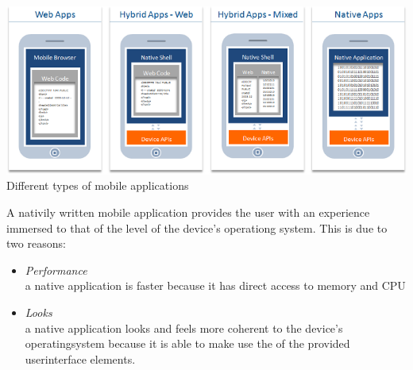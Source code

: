 \begin{centering}
\includegraphics[scale=0.5]{images/apptypesdefined.png}\\{Different types of mobile applications\cite{IBM-Worklight2012}}\\
\end{centering}

A nativily written mobile application provides the user with an experience immersed to that of the level of the device's operationg system. This is due to two reasons:
\begin{itemize}
\item
\emph{Performance}\\
a native application is faster because it has direct access to memory and CPU
\item \emph{Looks}\\
a native application looks and feels more coherent to the device's operatingsystem because it is able to make use the of the provided userinterface elements.
\end{itemize}